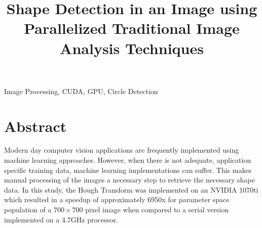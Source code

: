 \documentclass[conference]{IEEEtran}
\begin{document}
\title{Shape Detection in an Image using Parallelized Traditional Image Analysis Techniques\\
}

\author{
\and
}

\maketitle


\begin{IEEEkeywords}
Image Processing, CUDA, GPU, Circle Detection
\end{IEEEkeywords}

\section{Abstract}
Modern day computer vision applications are frequently implemented using machine learning approaches.
However, when there is not adequate, application specific training data, machine learning implementations can suffer.
This makes manual processing of the images a necessary step to retrieve the necessary shape data.
In this study, the Hough Transform was implemented on an NVIDIA 1070ti which resulted in a speedup of approximately 6950x for parameter space population of a $700 \times 700$ pixel image when compared to a serial version implemented on a 4.7GHz processor. 

\end{document}
